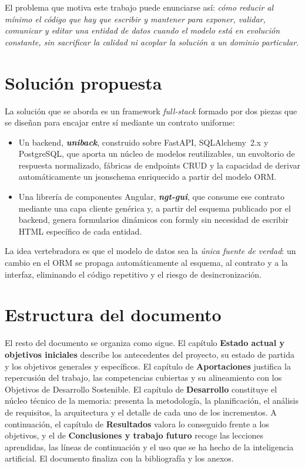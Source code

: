 El problema que motiva este trabajo puede enunciarse así: \emph{cómo reducir
al mínimo el código que hay que escribir y mantener para exponer, validar,
comunicar y editar una entidad de datos cuando el modelo está en evolución
constante, sin sacrificar la calidad ni acoplar la solución a un dominio
particular}.

\section{Solución propuesta}
La solución que se aborda es un framework \emph{full-stack} formado por dos
piezas que se diseñan para encajar entre sí mediante un contrato uniforme:

\begin{itemize}
  \item Un backend, \textbf{\emph{uniback}}, construido sobre FastAPI,
  SQLAlchemy~2.x y PostgreSQL, que aporta un núcleo de modelos reutilizables,
  un envoltorio de respuesta normalizado, fábricas de endpoints CRUD y la
  capacidad de derivar automáticamente un \gls{jsonschema} enriquecido a
  partir del modelo ORM.
  \item Una librería de componentes Angular, \textbf{\emph{ngt-gui}}, que
  consume ese contrato mediante una capa cliente genérica y, a partir del
  esquema publicado por el backend, genera formularios dinámicos con
  \gls{formly} sin necesidad de escribir HTML específico de cada entidad.
\end{itemize}

La idea vertebradora es que el modelo de datos sea la \emph{única fuente de
verdad}: un cambio en el ORM se propaga automáticamente al esquema, al
contrato y a la interfaz, eliminando el código repetitivo y el riesgo de
desincronización.

\section{Estructura del documento}
El resto del documento se organiza como sigue. El capítulo
\textbf{Estado actual y objetivos iniciales} describe los antecedentes del
proyecto, su estado de partida y los objetivos generales y específicos. El
capítulo de \textbf{Aportaciones} justifica la repercusión del trabajo, las
competencias cubiertas y su alineamiento con los Objetivos de Desarrollo
Sostenible. El capítulo de \textbf{Desarrollo} constituye el núcleo técnico de
la memoria: presenta la metodología, la planificación, el análisis de
requisitos, la arquitectura y el detalle de cada uno de los incrementos. A
continuación, el capítulo de \textbf{Resultados} valora lo conseguido frente a
los objetivos, y el de \textbf{Conclusiones y trabajo futuro} recoge las
lecciones aprendidas, las líneas de continuación y el uso que se ha hecho de
la inteligencia artificial. El documento finaliza con la bibliografía y los
anexos.
